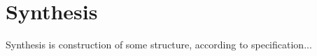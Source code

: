 \chapter{Synthesis}

Synthesis is construction of some structure, according to specification...






